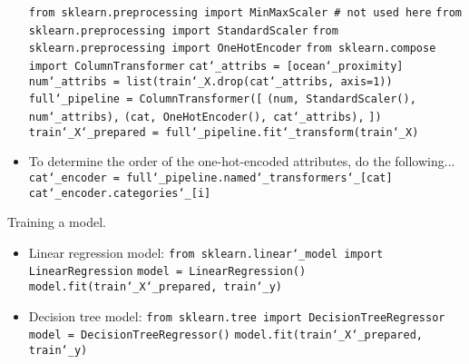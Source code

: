 \begin{itemize}
\texttt{from sklearn.preprocessing import MinMaxScaler \# not used here}\newline
\texttt{from sklearn.preprocessing import StandardScaler}\newline
\texttt{from sklearn.preprocessing import OneHotEncoder}\newline
\texttt{from sklearn.compose import ColumnTransformer}\newline
\newline
\texttt{cat\char`_attribs = [\textquotesingle ocean\char`_proximity\textquotesingle]}\newline
\texttt{num\char`_attribs = list(train\char`_X.drop(cat\char`_attribs, axis=1))}\newline
\newline
\texttt{full\char`_pipeline = ColumnTransformer([}\newline
\texttt{(\textquotesingle num\textquotesingle, StandardScaler(), num\char`_attribs),}\newline
\texttt{(\textquotesingle cat\textquotesingle, OneHotEncoder(), cat\char`_attribs),}\newline
\texttt{])}\newline
\newline
\texttt{train\char`_X\char`_prepared = full\char`_pipeline.fit\char`_transform(train\char`_X)}\newline
\item
To determine the order of the one-hot-encoded attributes, do the following...\newline
\texttt{cat\char`_encoder = full\char`_pipeline.named\char`_transformers\char`_[\textquotesingle cat\textquotesingle]}\newline
\texttt{cat\char`_encoder.categories\char`_[i]}
\end{itemize}

Training a model.
\vspace{-3.0mm}
\begin{itemize}
\item
Linear regression model:\newline
\texttt{from sklearn.linear\char`_model import LinearRegression}\newline
\texttt{model = LinearRegression()}\newline
\texttt{model.fit(train\char`_X\char`_prepared, train\char`_y)}
\item
Decision tree model:\newline
\texttt{from sklearn.tree import DecisionTreeRegressor}\newline
\texttt{model = DecisionTreeRegressor()}\newline
\texttt{model.fit(train\char`_X\char`_prepared, train\char`_y)}
\end{itemize}


